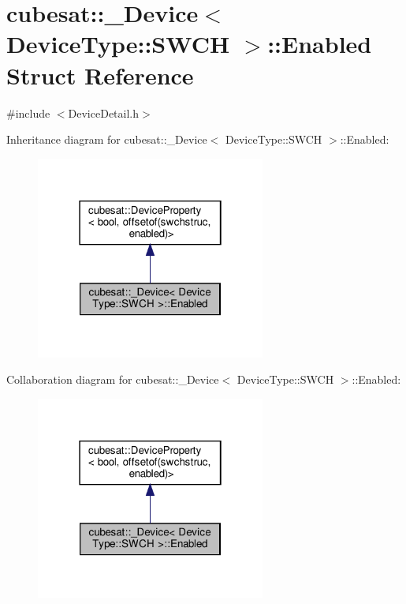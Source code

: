 \hypertarget{structcubesat_1_1__Device_3_01DeviceType_1_1SWCH_01_4_1_1Enabled}{}\section{cubesat\+:\+:\+\_\+\+Device$<$ Device\+Type\+:\+:S\+W\+CH $>$\+:\+:Enabled Struct Reference}
\label{structcubesat_1_1__Device_3_01DeviceType_1_1SWCH_01_4_1_1Enabled}


{\ttfamily \#include $<$Device\+Detail.\+h$>$}



Inheritance diagram for cubesat\+:\+:\+\_\+\+Device$<$ Device\+Type\+:\+:S\+W\+CH $>$\+:\+:Enabled\+:\nopagebreak
\begin{figure}[H]
\begin{center}
\leavevmode
\includegraphics[width=214pt]{structcubesat_1_1__Device_3_01DeviceType_1_1SWCH_01_4_1_1Enabled__inherit__graph}
\end{center}
\end{figure}


Collaboration diagram for cubesat\+:\+:\+\_\+\+Device$<$ Device\+Type\+:\+:S\+W\+CH $>$\+:\+:Enabled\+:\nopagebreak
\begin{figure}[H]
\begin{center}
\leavevmode
\includegraphics[width=214pt]{structcubesat_1_1__Device_3_01DeviceType_1_1SWCH_01_4_1_1Enabled__coll__graph}
\end{center}
\end{figure}

